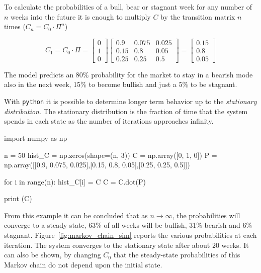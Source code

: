 To calculate the probabilities of a bull, bear or stagnant week for any number of $n$ weeks into the future it is enough to multiply $C$ by the transition matrix $n$ times ($C_n = C_0\cdot \Pi^n$)

\[C_1 = C_0 \cdot \Pi =  
\begin{bmatrix}
0 \\
1 \\
0 
\end{bmatrix}
\begin{bmatrix}
0.9 & 0.075 & 0.025 \\
0.15 & 0.8 & 0.05 \\
0.25 & 0.25 & 0.5
\end{bmatrix} = 
\begin{bmatrix}
0.15 \\
0.8 \\
0.05 
\end{bmatrix}
\]

The model predicts an 80\% probability for the market to stay in a bearish mode also in the next week, 15\% to become bullish and just a 5\% to be stagnant.

With \texttt{python} it is possible to determine longer term behavior up to the \emph{stationary distribution}. The stationary distribution is the fraction of time that the system spends in each state as the number of iterations approaches infinity.

\begin{ipython}
import numpy as np

n = 50
hist_C = np.zeros(shape=(n, 3))
C = np.array([0, 1, 0])
P = np.array([[0.9, 0.075, 0.025],[0.15, 0.8, 0.05],[0.25, 0.25, 0.5]])

for i in range(n):
    hist_C[i] = C
    C = C.dot(P)

print (C)
\end{ipython}
\begin{ioutput}
[0.62499979 0.31250019 0.06250002]
\end{ioutput}

From this example it can be concluded that as $n \rightarrow \infty$, the probabilities will converge to a steady state, 63\% of all weeks will be bullish, 31\% bearish and 6\% stagnant. Figure~\ref{fig:markov_chain_sim} reports the various probabilities at each iteration. The system converges to the stationary state after about 20 weeks.
It can also be shown, by changing $C_0$ that the steady-state probabilities of this Markov chain do not depend upon the initial state. 

